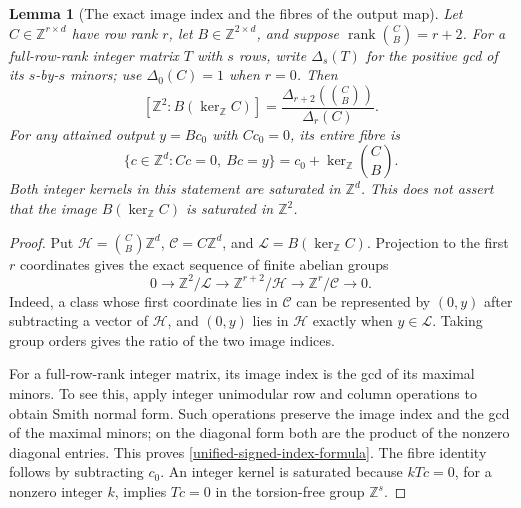 \documentclass[11pt,a4paper]{article}
\newtheorem{lemma}[theorem]{Lemma}
\theoremstyle{definition}
\theoremstyle{remark}
\begin{document}
\begin{lemma}[The exact image index and the fibres of the output map]
\label{unified-signed-image-index}
Let $C\in\mathbb Z^{r\times d}$ have row rank $r$, let
$B\in\mathbb Z^{2\times d}$, and suppose
$\operatorname{rank}\binom CB=r+2$.
For a full-row-rank integer matrix $T$ with $s$ rows, write
$\Delta_s(T)$ for the positive gcd of its $s$-by-$s$ minors;
use $\Delta_0(C)=1$ when $r=0$.  Then
\begin{equation}\label{unified-signed-index-formula}
 \left[\mathbb Z^2:B(\ker_{\mathbb Z}C)\right]
 =\frac{\Delta_{r+2}\!\left(\binom CB\right)}{\Delta_r(C)}.
\end{equation}
For any attained output $y=Bc_0$ with $Cc_0=0$, its entire fibre is
\[
 \{c\in\mathbb Z^d:Cc=0,\ Bc=y\}
 =c_0+\ker_{\mathbb Z}\binom CB.
\]
Both integer kernels in this statement are saturated in
$\mathbb Z^d$.  This does not assert that the image
$B(\ker_{\mathbb Z}C)$ is saturated in $\mathbb Z^2$.
\end{lemma}

\begin{proof}
Put $\mathcal H=\binom CB\mathbb Z^d$,
$\mathcal C=C\mathbb Z^d$, and
$\mathcal L=B(\ker_{\mathbb Z}C)$.
Projection to the first $r$ coordinates gives the exact sequence
of finite abelian groups
\[
 0\longrightarrow\mathbb Z^2/\mathcal L
 \longrightarrow\mathbb Z^{r+2}/\mathcal H
 \longrightarrow\mathbb Z^r/\mathcal C
 \longrightarrow0.
\]
Indeed, a class whose first coordinate lies in $\mathcal C$ can
be represented by $(0,y)$ after subtracting a vector of
$\mathcal H$, and $(0,y)$ lies in $\mathcal H$ exactly when
$y\in\mathcal L$.  Taking group orders gives the ratio of the
two image indices.

For a full-row-rank integer matrix, its image index is the gcd of
its maximal minors.  To see this, apply integer unimodular row and
column operations to obtain Smith normal form.  Such operations
preserve the image index and the gcd of the maximal minors; on
the diagonal form both are the product of the nonzero diagonal
entries.  This proves \eqref{unified-signed-index-formula}.
The fibre identity follows by subtracting $c_0$.
An integer kernel is saturated because $kTc=0$, for a nonzero
integer $k$, implies $Tc=0$ in the torsion-free group
$\mathbb Z^s$.
\end{proof}
\end{document}
